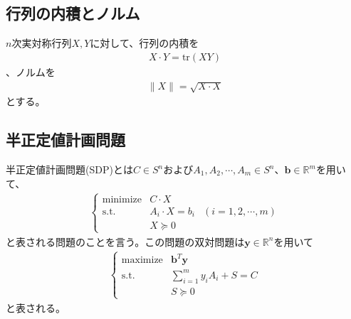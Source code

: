 \subsection{行列の内積とノルム}
$n$次実対称行列$X, Y$に対して、行列の内積を
\begin{align*}
  X \cdot Y = \mathrm{tr}(X Y)
\end{align*}
、ノルムを
\begin{align*}
  \|X\| = \sqrt{X \cdot X}
\end{align*}
とする。

\subsection{半正定値計画問題}
半正定値計画問題(SDP)とは$C \in S^n$および$A_1, A_2, \cdots, A_m \in S^n$、$\mathbf{b} \in \mathbb{R}^m$を用いて、
\begin{align} \label{MainProblem}
  \left\{
    \begin{array}{lll}
      \mathrm{minimize} & C \cdot X \\
      \mathrm{s.t.}     & A_i \cdot X = b_i & (i = 1, 2, \cdots, m) \\
                        & X \succeq 0
    \end{array}
  \right.
\end{align}
と表される問題のことを言う。この問題の双対問題は$\mathbf{y} \in \mathbb{R}^n$を用いて
\begin{align} \label{DualProblem}
  \left\{
    \begin{array}{lll}
      \mathrm{maximize} & \mathbf{b}^T \mathbf{y} \\
      \mathrm{s.t.}     & \displaystyle{\sum_{i = 1}^m} y_i A_i + S = C \\
                        & S \succeq 0
    \end{array}
  \right.
\end{align}
と表される。


